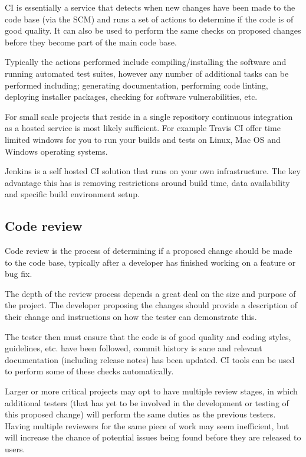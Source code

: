 \documentclass[jnr]{iosart2x}
\begin{document}
CI is essentially a service that detects when new changes have been made to the code base (via the SCM) and runs a set of actions to determine if the code is of good quality.
It can also be used to perform the same checks on proposed changes before they become part of the main code base.

Typically the actions performed include compiling/installing the software and running automated test suites, however any number of additional tasks can be performed including; generating documentation, performing code linting, deploying installer packages, checking for software vulnerabilities, etc.

For small scale projects that reside in a single repository continuous integration as a hosted service is most likely sufficient.
For example Travis CI offer time limited windows for you to run your builds and tests on Linux, Mac OS and Windows operating systems.

Jenkins is a self hosted CI solution that runs on your own infrastructure.
The key advantage this has is removing restrictions around build time, data availability and specific build environment setup.

\subsection{Code review}
\label{Code review}

Code review is the process of determining if a proposed change should be made to the code base, typically after a developer has finished working on a feature or bug fix.

The depth of the review process depends a great deal on the size and purpose of the project.
The developer proposing the changes should provide a description of their change and instructions on how the tester can demonstrate this.

The tester then must ensure that the code is of good quality and coding styles, guidelines, etc. have been followed, commit history is sane and relevant documentation (including release notes) has been updated.
CI tools can be used to perform some of these checks automatically.

Larger or more critical projects may opt to have multiple review stages, in which additional testers (that has yet to be involved in the development or testing of this proposed change) will perform the same duties as the previous testers.
Having multiple reviewers for the same piece of work may seem inefficient, but will increase the chance of potential issues being found before they are released to users.
\end{document}
